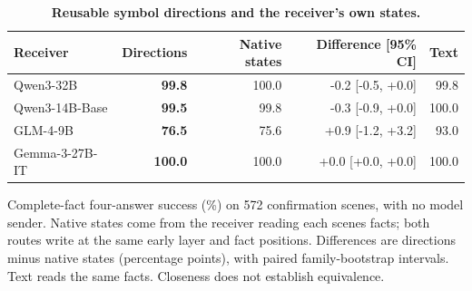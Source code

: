 \begin{table}[!htbp]
\caption{\textbf{Reusable symbol directions and the receiver's own states.}}
\label{tab:recovery_native}
\centering\small
\setlength{\tabcolsep}{3.5pt}\renewcommand{\arraystretch}{1.12}
\begin{tabular*}{\linewidth}{@{\extracolsep{\fill}}lrrrr@{}}
\toprule
Receiver & \textbf{Directions} & Native states & Difference [95\% CI] & Text \\
\midrule
Qwen3-32B & \textbf{99.8} & 100.0 & -0.2 [-0.5, +0.0] & 99.8 \\
Qwen3-14B-Base & \textbf{99.5} & 99.8 & -0.3 [-0.9, +0.0] & 100.0 \\
GLM-4-9B & \textbf{76.5} & 75.6 & +0.9 [-1.2, +3.2] & 93.0 \\
Gemma-3-27B-IT & \textbf{100.0} & 100.0 & +0.0 [+0.0, +0.0] & 100.0 \\
\bottomrule
\end{tabular*}
\par\vspace{3pt}
{\footnotesize\raggedright Complete-fact four-answer success (\%) on 572 confirmation scenes, with no model sender. Native states come from the receiver reading each scene\textquotesingle s facts; both routes write at the same early layer and fact positions. Differences are directions minus native states (percentage points), with paired family-bootstrap intervals. Text reads the same facts. Closeness does not establish equivalence.\par}
\end{table}
